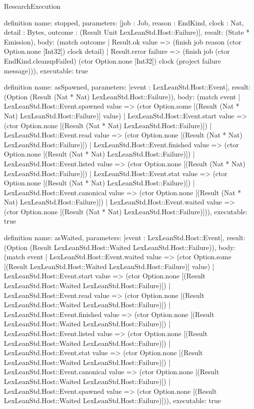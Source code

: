 \begin{lexlean}{ResearchExecution}
\begin{semanticmodule}
definition{
  name: stopped,
  parameters: [job : Job, reason : EndKind, clock : Nat, detail : Bytes, outcome : (Result Unit LexLeanStd.Host::Failure)],
  result: (State * Emission),
  body: (match outcome
    | Result.ok value => (finish job reason (ctor Option.none [Int32]) clock detail)
    | Result.error failure => (finish job (ctor EndKind.cleanupFailed) (ctor Option.none [Int32]) clock (project failure message))),
  executable: true
}

definition{
  name: asSpawned,
  parameters: [event : LexLeanStd.Host::Event],
  result: (Option (Result (Nat * Nat) LexLeanStd.Host::Failure)),
  body: (match event
    | LexLeanStd.Host::Event.spawned value => (ctor Option.some [(Result (Nat * Nat) LexLeanStd.Host::Failure)] value)
    | LexLeanStd.Host::Event.start value => (ctor Option.none [(Result (Nat * Nat) LexLeanStd.Host::Failure)])
    | LexLeanStd.Host::Event.read value => (ctor Option.none [(Result (Nat * Nat) LexLeanStd.Host::Failure)])
    | LexLeanStd.Host::Event.finished value => (ctor Option.none [(Result (Nat * Nat) LexLeanStd.Host::Failure)])
    | LexLeanStd.Host::Event.listed value => (ctor Option.none [(Result (Nat * Nat) LexLeanStd.Host::Failure)])
    | LexLeanStd.Host::Event.stat value => (ctor Option.none [(Result (Nat * Nat) LexLeanStd.Host::Failure)])
    | LexLeanStd.Host::Event.canonical value => (ctor Option.none [(Result (Nat * Nat) LexLeanStd.Host::Failure)])
    | LexLeanStd.Host::Event.waited value => (ctor Option.none [(Result (Nat * Nat) LexLeanStd.Host::Failure)])),
  executable: true
}

definition{
  name: asWaited,
  parameters: [event : LexLeanStd.Host::Event],
  result: (Option (Result LexLeanStd.Host::Waited LexLeanStd.Host::Failure)),
  body: (match event
    | LexLeanStd.Host::Event.waited value => (ctor Option.some [(Result LexLeanStd.Host::Waited LexLeanStd.Host::Failure)] value)
    | LexLeanStd.Host::Event.start value => (ctor Option.none [(Result LexLeanStd.Host::Waited LexLeanStd.Host::Failure)])
    | LexLeanStd.Host::Event.read value => (ctor Option.none [(Result LexLeanStd.Host::Waited LexLeanStd.Host::Failure)])
    | LexLeanStd.Host::Event.finished value => (ctor Option.none [(Result LexLeanStd.Host::Waited LexLeanStd.Host::Failure)])
    | LexLeanStd.Host::Event.listed value => (ctor Option.none [(Result LexLeanStd.Host::Waited LexLeanStd.Host::Failure)])
    | LexLeanStd.Host::Event.stat value => (ctor Option.none [(Result LexLeanStd.Host::Waited LexLeanStd.Host::Failure)])
    | LexLeanStd.Host::Event.canonical value => (ctor Option.none [(Result LexLeanStd.Host::Waited LexLeanStd.Host::Failure)])
    | LexLeanStd.Host::Event.spawned value => (ctor Option.none [(Result LexLeanStd.Host::Waited LexLeanStd.Host::Failure)])),
  executable: true
}


\end{semanticmodule}
\end{lexlean}
